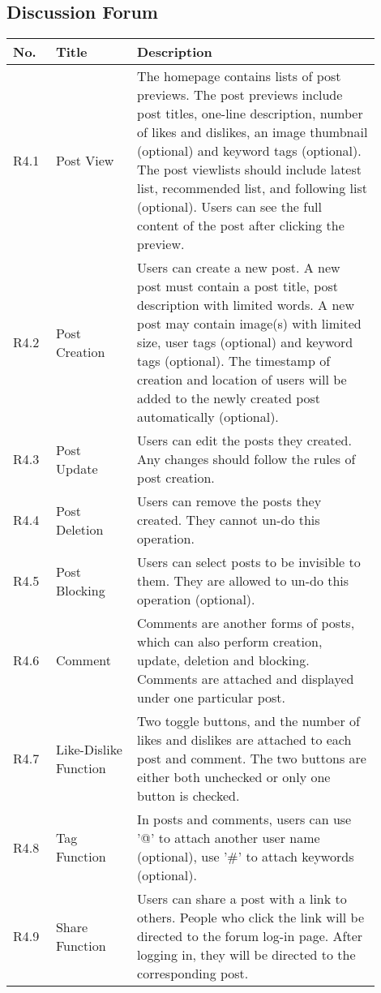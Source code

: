\documentclass[a4paper,11pt]{scrreprt}
\begin{document}
\subsection{Discussion Forum}
\begin{longtable}{|>{\centering\arraybackslash}m{0.1\linewidth}|>{\centering\arraybackslash}m{0.2\linewidth}|m{0.6\linewidth}|} \hline
     No.&  Title&Description\\ \hline 
     R4.1&   Post View&The homepage contains lists of post previews. The post previews include post titles, one-line description, number of likes and dislikes, an image thumbnail (optional) and keyword tags (optional). The post viewlists should include latest list, recommended list, and following list (optional). Users can see the full content of the post after clicking the preview.\\ \hline 
     R4.2&   Post Creation&Users can create a new post. A new post must contain a post title, post description with limited words.  A new post may contain image(s) with limited size, user tags (optional) and keyword tags (optional). The timestamp of creation and location of users will be added to the newly created post automatically (optional).\\ \hline 
     R4.3&   Post Update &Users can edit the posts they created. Any changes should follow the rules of post creation.\\ \hline 
     R4.4&   Post Deletion&Users can remove the posts they created. They cannot un-do this operation.\\ \hline 
     R4.5&   Post Blocking&Users can select posts to be invisible to them. They are allowed to un-do this operation (optional).\\ \hline 
     R4.6&   Comment&Comments are another forms of posts, which can also perform creation, update, deletion and blocking. Comments are attached and displayed under one particular post. \\\hline
     R4.7& Like-Dislike Function&Two toggle buttons, and the number of likes and dislikes are attached to each post and comment. The two buttons are either both unchecked or only one button is checked.\\\hline
 R4.8& Tag Function&In posts and comments, users can use '@' to attach another user name (optional), use '\#' to attach keywords (optional).\\\hline
 R4.9& Share Function&Users can share a post with a link to others. People who click the link will be directed to the forum log-in page. After logging in, they will be directed to the corresponding post. \\\hline

\end{longtable}
\end{document}
